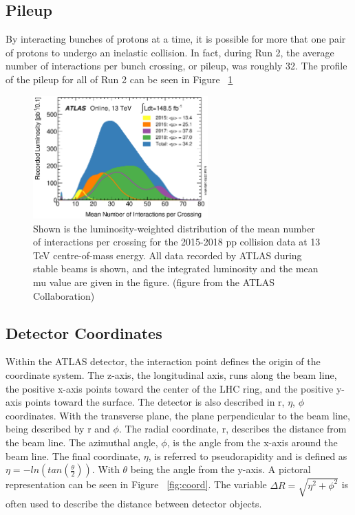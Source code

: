 \subsection{Pileup}
\indent By interacting bunches of protons at a time, it is possible for more that one pair of protons to undergo an inelastic collision. In fact, during Run 2,  the average number of interactions per bunch crossing, or pileup, was roughly 32. The profile of the pileup for all of Run 2 can be seen in Figure ~\ref{fig:mu} 

\begin{figure}[H]
\begin{center}
\includegraphics*[width=0.60\textwidth] {figures/mu_2015_2018}%
\caption[Number of interactions per bunch crossing]{Shown is the luminosity-weighted distribution of the mean number of interactions per crossing for the 2015-2018 pp collision data at 13 TeV centre-of-mass energy. All data recorded by ATLAS during stable beams is shown, and the integrated luminosity and the mean mu value are given in the figure. (figure from the ATLAS Collaboration)}
\label{fig:mu}
\end{center}
\end{figure}

\subsection{Detector Coordinates}
Within the ATLAS detector, the interaction point defines the origin of the coordinate system. The z-axis, the longitudinal axis, runs along the beam line, the positive x-axis points toward the center of the LHC ring, and the positive y-axis points toward the surface. The detector is also described in r, ${\eta}$, ${\phi}$ coordinates. With the transverse plane, the plane perpendicular to the beam line, being described by r and ${\phi}$. The radial coordinate, r, describes the distance from the beam line. The azimuthal angle, ${\phi}$, is the angle from the x-axis around the beam line. The final coordinate, ${\eta}$, is referred to pseudorapidity and is defined as ${\eta = -ln(tan(\frac{\theta}{2}))}$. With ${\theta}$ being the angle from the y-axis. A pictoral representation can be seen in Figure ~\ref{fig:coord}. The variable ${\Delta{R}=\sqrt{\eta^{2} + \phi^{2}}}$ is often used to describe the distance between detector objects.

